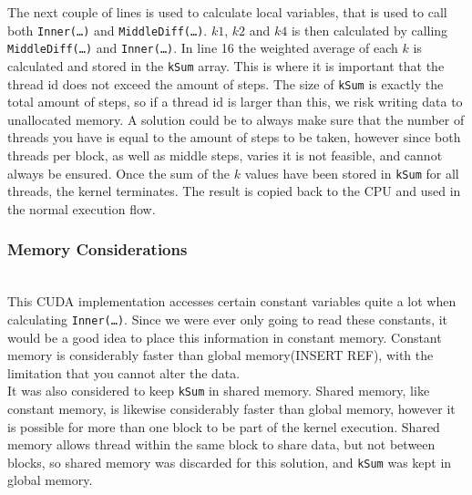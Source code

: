 The next couple of lines is used to calculate local variables, that is used to call both \texttt{Inner(…)} and \texttt{MiddleDiff(…)}. $k1$, $k2$ and $k4$ is then calculated by calling \texttt{MiddleDiff(…)} and \texttt{Inner(…)}. In line 16 the weighted average of each $k$ is calculated and stored in the \texttt{kSum} array. This is where it is important that the thread id does not exceed the amount of steps. The size of \texttt{kSum} is exactly the total amount of steps, so if a thread id is larger than this, we risk writing data to unallocated memory. A solution could be to always make sure that the number of threads you have is equal to the amount of steps to be taken, however since both threads per block, as well as middle steps, varies it is not feasible, and cannot always be ensured. Once the sum of the $k$ values have been stored in \texttt{kSum} for all threads, the kernel terminates. The result is copied back to the CPU and used in the normal execution flow.

\subsubsection{Memory Considerations} \hfill \\
This CUDA implementation accesses certain constant variables quite a lot when calculating \texttt{Inner(…)}. Since we were ever only going to read these constants, it would be a good idea to place this information in constant memory. Constant memory is considerably faster than global memory(INSERT REF), with the limitation that you cannot alter the data.\\

It was also considered to keep \texttt{kSum} in shared memory. Shared memory, like constant memory, is likewise considerably faster than global memory, however it is possible for more than one block to be part of the kernel execution. Shared memory allows thread within the same block to share data, but not between blocks, so shared memory was discarded for this solution, and \texttt{kSum} was kept in global memory.

